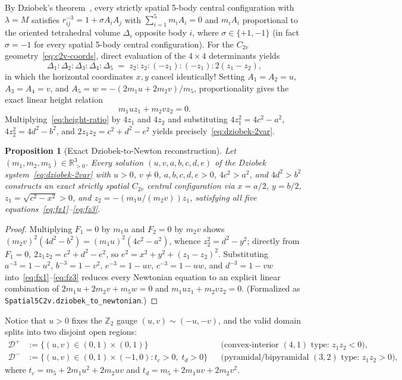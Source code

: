 \documentclass[11pt,a4paper]{amsart}
\newtheorem{proposition}[theorem]{Proposition}
\theoremstyle{definition}
\theoremstyle{remark}
\newcommand{\R}{\mathbb{R}}
\newcommand{\Z}{\mathbb{Z}}
\begin{document}
By Dziobek's theorem~\cite{Dziobek1900}, every strictly spatial 5-body central
configuration with $\lambda = M$ satisfies $r_{ij}^{-3} = 1 + \sigma A_i A_j$ with
$\sum_{i=1}^5 m_i A_i = 0$ and $m_i A_i$ proportional to the oriented tetrahedral volume
$\Delta_i$ opposite body $i$, where $\sigma \in \{+1, -1\}$ (in fact $\sigma = -1$ for
every spatial 5-body central configuration).
For the $C_{2v}$ geometry~\eqref{eq:c2v-coords}, direct evaluation of the $4 \times 4$
determinants yields
\[
  \Delta_1 : \Delta_2 : \Delta_3 : \Delta_4 : \Delta_5
  \;=\; z_2 : z_2 : (-z_1) : (-z_1) : 2(z_1 - z_2),
\]
in which the horizontal coordinates $x, y$ cancel identically!
Setting $A_1 = A_2 = u$, $A_3 = A_4 = v$, and
$A_5 = w = -(2 m_1 u + 2 m_2 v)/m_5$, proportionality gives the exact linear height
relation
\begin{equation}\label{eq:height-ratio}
  m_1 u z_1 + m_2 v z_2 = 0.
\end{equation}
Multiplying~\eqref{eq:height-ratio} by $4 z_1$ and $4 z_2$ and substituting
$4 z_1^2 = 4 c^2 - a^2$, $4 z_2^2 = 4 d^2 - b^2$, and $2 z_1 z_2 = c^2 + d^2 - e^2$
yields precisely~\eqref{eq:dziobek-2var}.

\begin{proposition}[Exact Dziobek-to-Newton reconstruction]\label{prop:reconstruct}
Let $(m_1, m_2, m_5) \in \R_{>0}^3$. Every solution $(u, v, a, b, c, d, e)$ of the
Dziobek system~\eqref{eq:dziobek-2var} with $u > 0$, $v \neq 0$, $a,b,c,d,e > 0$,
$4c^2 > a^2$, and $4d^2 > b^2$ constructs an exact strictly spatial $C_{2v}$ central
configuration via $x = a/2$, $y = b/2$, $z_1 = \sqrt{c^2 - x^2} > 0$, and
$z_2 = -(m_1 u / (m_2 v)) z_1$, satisfying all five equations~\eqref{eq:fx1}--\eqref{eq:fz3}.
\end{proposition}

\begin{proof}
Multiplying $F_1 = 0$ by $m_1 u$ and $F_2 = 0$ by $m_2 v$ shows
$(m_2 v)^2 (4 d^2 - b^2) = (m_1 u)^2 (4 c^2 - a^2)$, whence $z_2^2 = d^2 - y^2$;
directly from $F_1 = 0$, $2 z_1 z_2 = c^2 + d^2 - e^2$, so
$e^2 = x^2 + y^2 + (z_1 - z_2)^2$.
Substituting $a^{-3} = 1 - u^2$, $b^{-3} = 1 - v^2$, $e^{-3} = 1 - uv$,
$c^{-3} = 1 - uw$, and $d^{-3} = 1 - vw$ into~\eqref{eq:fx1}--\eqref{eq:fz3} reduces
every Newtonian equation to an explicit linear combination of $2m_1 u + 2m_2 v + m_5 w = 0$
and $m_1 u z_1 + m_2 v z_2 = 0$.
(Formalized as \texttt{Spatial5C2v.dziobek\_to\_newtonian}.)
\end{proof}

Notice that $u > 0$ fixes the $\Z_2$ gauge $(u, v) \sim (-u, -v)$, and the valid domain
splits into two disjoint open regions:
\begin{align*}
  \mathcal{D}^+ &:= \{(u,v) \in (0,1) \times (0,1)\}
    &&\text{(convex-interior $(4,1)$ type: $z_1 z_2 < 0$)},\\
  \mathcal{D}^- &:= \{(u,v) \in (0,1) \times (-1,0) : t_c > 0,\; t_d > 0\}
    &&\text{(pyramidal/bipyramidal $(3,2)$ type: $z_1 z_2 > 0$)},
\end{align*}
where $t_c = m_5 + 2 m_1 u^2 + 2 m_2 uv$ and $t_d = m_5 + 2 m_1 uv + 2 m_2 v^2$.
\end{document}
